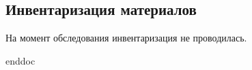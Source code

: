 %
\subsection{Инвентаризация материалов}

На момент обследования инвентаризация не проводилась.

 {enddoc}
